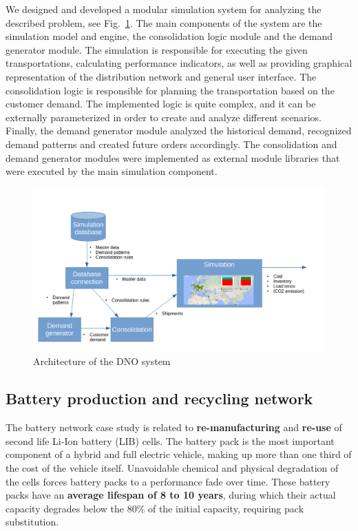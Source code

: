 \documentclass{article}
\begin{document}
We designed and developed a modular simulation system for analyzing the described problem, see Fig.~\ref{fig:dno}. The main components of the system are the simulation model and engine, the consolidation logic module and the demand generator module. The simulation is responsible for executing the given transportations, calculating performance indicators, as well as providing graphical representation of the distribution network and general user interface. The consolidation logic is responsible for planning the transportation based on the customer demand. The implemented logic is quite complex, and it can be externally parameterized in order to create and analyze different scenarios. Finally, the demand generator module analyzed the historical demand, recognized demand patterns and created future orders accordingly. The consolidation and demand generator modules were implemented as external module libraries that were executed by the main simulation component.

\begin{figure}[ht!]
	\center
	\includegraphics[width=\textwidth]{dno.png} 
	\caption{Architecture of the DNO system}\label{fig:dno}
\end{figure}


\subsection{Battery production and recycling network}


The battery network case study is related to \textbf{re-manufacturing} and \textbf{re-use} of second life Li-Ion battery (LIB) cells. The battery pack is the most important component of a hybrid and full electric vehicle, making up more than one third of the cost of the vehicle itself. Unavoidable chemical and physical degradation of the cells forces battery packs to a performance fade over time. These battery packs have an \textbf{average lifespan of 8 to 10 years}, during which their actual capacity degrades below the 80\% of the initial capacity, requiring pack substitution.
\end{document}
